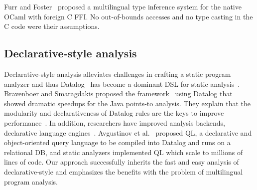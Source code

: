 Furr and Foster~\cite{furr2005, furr2008} proposed a multilingual type inference
system for the native OCaml with foreign C FFI.  No out-of-bounds accesses and
no type casting in the C code were their assumptions.

\subsection{Declarative-style analysis}
Declarative-style analysis alleviates challenges in crafting a static program
analyzer and thus Datalog~\cite{allen2015D, allen2015stagedD, alpuente2010D, doop, dawson1996D, naik2006D, reps1994D, smaragdakis2014D, whaley2005D} has become a dominant
DSL for static analysis~\cite{scholz2016}.
Bravenboer and Smaragdakis proposed the \doop framework~\cite{doop} using Datalog
that showed dramatic speedups for the Java points-to analysis.  They explain that
the modularity and declarativeness of Datalog rules are the keys to improve
performance~\cite{doopWorkshop}.  In addition, researchers have improved
analysis backends, declarative language engines~\cite{whaley2005D, hoder2011muz, souffle, madsen2016}.
Avgustinov et al.~\cite{ql2016} proposed QL, a declarative and object-oriented
query language to be compiled into Datalog and runs on a relational DB, and static
analyzers implemented QL which scale to millions of lines of code.
Our approach successfully inherits the fast and easy analysis of declarative-style
and emphasizes the benefits with the problem of multilingual program analysis.
